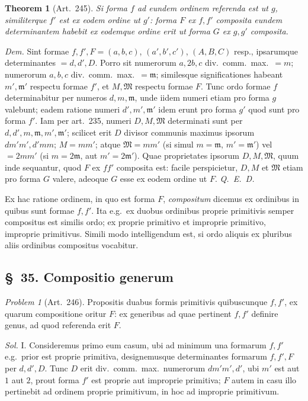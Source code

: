 \documentclass[12pt,a4paper]{article}
\theoremstyle{plain}
\newtheorem{theorem}{Theorem}[section]
\theoremstyle{definition}
\theoremstyle{remark}
\theoremstyle{problemstyle}
\newtheorem{problem}{Problem}[section]
\begin{document}
\begin{theorem}[Art.\ 245]
Si forma $f$ ad eundem ordinem referenda est ut $g$, similiterque $f'$ est ex eodem ordine ut $g'$: forma $F$ ex $f, f'$ composita eundem determinantem habebit ex eodemque ordine erit ut forma $G$ ex $g, g'$ composita.
\end{theorem}

\emph{Dem.} Sint formae $f, f', F = (a, b, c)$, $(a', b', c')$, $(A, B, C)$ resp., ipsarumque determinantes $= d, d', D$. Porro sit numerorum $a, 2b, c$ div.\ comm.\ max.\ $= m$; numerorum $a, b, c$ div.\ comm.\ max.\ $= \mathfrak{m}$; similesque significationes habeant $m', \mathfrak{m}'$ respectu formae $f'$, et $M, \mathfrak{M}$ respectu formae $F$. Tunc ordo formae $f$ determinabitur per numeros $d, m, \mathfrak{m}$, unde iidem numeri etiam pro forma $g$ valebunt; eadem ratione numeri $d', m', \mathfrak{m}'$ idem erunt pro forma $g'$ quod sunt pro forma $f'$. Iam per art.\ 235, numeri $D, M, \mathfrak{M}$ determinati sunt per $d, d', m, \mathfrak{m}, m', \mathfrak{m}'$; scilicet erit $D$ divisor communis maximus ipsorum $dm'm', d'mm$; $M = mm'$; atque $\mathfrak{M} = mm'$ (si simul $m = \mathfrak{m}$, $m' = \mathfrak{m}'$) vel $= 2mm'$ (si $m = 2\mathfrak{m}$, aut $m' = 2\mathfrak{m}'$). Quae proprietates ipsorum $D, M, \mathfrak{M}$, quum inde sequantur, quod $F$ ex $ff'$ composita est: facile perspicietur, $D, M$ et $\mathfrak{M}$ etiam pro forma $G$ valere, adeoque $G$ esse ex eodem ordine ut $F$. \emph{Q.\ E.\ D.}

Ex hac ratione ordinem, in quo est forma $F$, \emph{compositum} dicemus ex ordinibus in quibus sunt formae $f, f'$. Ita e.g.\ ex duobus ordinibus proprie primitivis semper compositus est similis ordo; ex proprie primitivo et improprie primitivo, improprie primitivus. Simili modo intelligendum est, si ordo aliquis ex pluribus aliis ordinibus compositus vocabitur.


\subsection*{\S\ 35. Compositio generum}

\begin{problem}[Art.\ 246]
Propositis duabus formis primitivis quibuscunque $f, f'$, ex quarum compositione oritur $F$: ex generibus ad quae pertinent $f, f'$ definire genus, ad quod referenda erit $F$.
\end{problem}

\emph{Sol.} I. Consideremus primo eum casum, ubi ad minimum una formarum $f, f'$ e.g.\ prior est proprie primitiva, designemusque determinantes formarum $f, f', F$ per $d, d', D$. Tunc $D$ erit div.\ comm.\ max.\ numerorum $dm'm', d'$, ubi $m'$ est aut $1$ aut $2$, prout forma $f'$ est proprie aut improprie primitiva; $F$ autem in casu illo pertinebit ad ordinem proprie primitivum, in hoc ad improprie primitivum.
\end{document}
